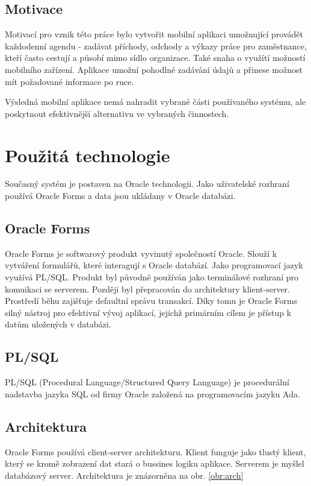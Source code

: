 \documentclass{diplomka}
\begin{document}
\subsection{Motivace}
Motivací pro vznik této práce bylo vytvořit mobilní aplikaci umožnující provádět každodenní agendu - zadávat příchody, odchody a výkazy práce pro zaměstnance, kteří často cestují a působí mimo sídlo organizace. Také snaha o využítí možností mobilního zařízení. Aplikace umožní pohodlné zadávání údajů a přinese možnost mít požadované informace po ruce.

Výsledná mobilní aplikace nemá nahradit vybrané části používaného systému, ale poskytnout efektivnější alternativu ve vybraných činnostech.


\section{Použitá technologie}
Současný systém je postaven na Oracle technologii. Jako uživatelské rozhraní používá Oracle Forms a data jsou ukládany v Oracle databázi.
 
\subsection{Oracle Forms}
Oracle Forms\cite{forms} je softwarový produkt vyvinutý společností Oracle. Slouží k vytváření formulářů, které interagují s Oracle databází. Jako programovací jazyk využívá PL/SQL. Produkt byl původně používán jako terminálové rozhraní pro komuikaci se serverem. Později byl přepracován do architektury klient-server.\\ \indent
Prostředí běhu zajišťuje defaultní správu transakcí. Díky tomu je Oracle Forms silný nástroj pro efektivní vývoj aplikací, jejichž primárním cílem je přístup k datům uložených v databázi. 

\subsection*{PL/SQL}
PL/SQL (Procedural Language/Structured Query Language) je procedurální nadstavba jazyka SQL od firmy Oracle založená na programovacím jazyku Ada.
\newpage
\subsection{Architektura}
Oracle Forms používá client-server architekturu. Klient funguje jako tlustý klient, který se kromě zobrazení dat stará o bussines logiku aplikace. Serverem je myšlel databázový server. Architektura je znázorněna na obr. \ref{obr:arch}
\end{document}
